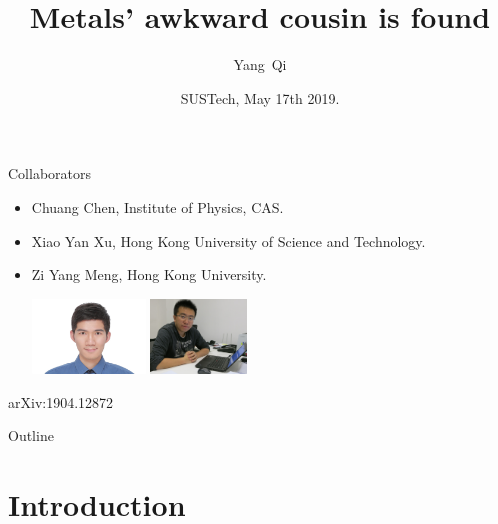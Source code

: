 \documentclass[xcolor=table, 10pt, aspectratio=43]{beamer}
\title[EQMC] %
{Metals' awkward cousin is found}
\author[Y Qi] %
{Yang~Qi}
\institute[Fudan] %
{
Department of Physics, Fudan University.
}
\date{SUSTech, May 17th 2019.}
\begin{document}
\begin{frame}
  \titlepage
\end{frame}

\begin{frame}{Collaborators}
\begin{itemize}
\item Chuang Chen, Institute of Physics, CAS.
\item Xiao Yan Xu, Hong Kong University of Science and Technology.
\item Zi Yang Meng, Hong Kong University.
\begin{center}
  \includegraphics[height=2cm]{../people/xiaoyanxu}
  \includegraphics[height=2cm]{../people/ziyangmeng}
\end{center}
\end{itemize}
\begin{center}
  \small arXiv:1904.12872
\end{center}
\end{frame}

\begin{frame}{Outline}
		\tableofcontents
\end{frame}

\section{Introduction}
\end{document}
